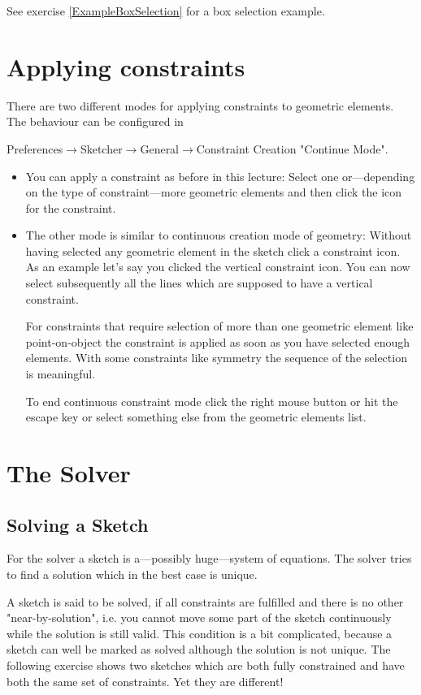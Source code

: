 \documentclass[12pt,titlepage]{article}
\newcommand{\menu}{\mbox{$\rightarrow$}}
\begin{document}
\begin{description}
      See exercise \vref{ExampleBoxSelection} for a box selection example.
\end{description}

\section{Applying constraints}
\label{ApplyingConstraints}
There are two different modes for applying constraints to geometric elements. The
behaviour can be configured in

Preferences\menu Sketcher\menu General\menu Constraint Creation "Continue
Mode".\label{continueConstraints}


\begin{itemize}
\item You can apply a constraint as before in this lecture: Select one or---depending
      on the type of constraint---more geometric elements and then click the icon for
      the constraint.
\item The other mode is similar to continuous creation mode of geometry: Without
      having selected any geometric element in the sketch click a constraint icon. As
      an example let's say you clicked the vertical constraint icon. You can now
      select subsequently all the lines which are supposed to have a vertical
      constraint.
      
      For constraints that require selection of more than one geometric element like
      point-on-object the constraint is applied as soon as you have selected enough
      elements. With some constraints like symmetry the sequence of the selection is
      meaningful.
      
      To end continuous constraint mode click the right mouse button or hit the
      escape key or select something else from the geometric elements list.
\end{itemize}

\section{The Solver}
\subsection{Solving a Sketch}
For the solver a sketch is a---possibly huge---system of equations. The solver tries to
find a solution which in the best case is unique.

A sketch is said to be solved, if all constraints are fulfilled and there is no other
"near-by-solution", i.e. you cannot move some part of the sketch continuously while
the solution is still valid. This condition is a bit complicated, because a sketch
can well be marked as solved although the solution is not unique. The following
exercise shows two sketches which are both fully constrained and have both the same set
of constraints. Yet they are different!
\end{document}
